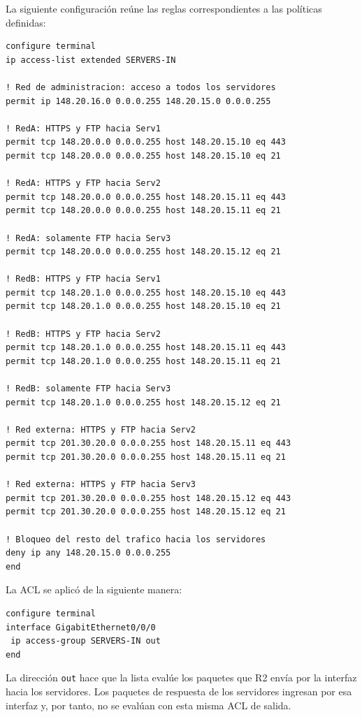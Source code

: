 \documentclass[12pt,a4paper]{article}
\begin{document}
La siguiente configuración reúne las reglas correspondientes
a las políticas definidas:

\begin{lstlisting}
configure terminal
ip access-list extended SERVERS-IN

! Red de administracion: acceso a todos los servidores
permit ip 148.20.16.0 0.0.0.255 148.20.15.0 0.0.0.255

! RedA: HTTPS y FTP hacia Serv1
permit tcp 148.20.0.0 0.0.0.255 host 148.20.15.10 eq 443
permit tcp 148.20.0.0 0.0.0.255 host 148.20.15.10 eq 21

! RedA: HTTPS y FTP hacia Serv2
permit tcp 148.20.0.0 0.0.0.255 host 148.20.15.11 eq 443
permit tcp 148.20.0.0 0.0.0.255 host 148.20.15.11 eq 21

! RedA: solamente FTP hacia Serv3
permit tcp 148.20.0.0 0.0.0.255 host 148.20.15.12 eq 21

! RedB: HTTPS y FTP hacia Serv1
permit tcp 148.20.1.0 0.0.0.255 host 148.20.15.10 eq 443
permit tcp 148.20.1.0 0.0.0.255 host 148.20.15.10 eq 21

! RedB: HTTPS y FTP hacia Serv2
permit tcp 148.20.1.0 0.0.0.255 host 148.20.15.11 eq 443
permit tcp 148.20.1.0 0.0.0.255 host 148.20.15.11 eq 21

! RedB: solamente FTP hacia Serv3
permit tcp 148.20.1.0 0.0.0.255 host 148.20.15.12 eq 21

! Red externa: HTTPS y FTP hacia Serv2
permit tcp 201.30.20.0 0.0.0.255 host 148.20.15.11 eq 443
permit tcp 201.30.20.0 0.0.0.255 host 148.20.15.11 eq 21

! Red externa: HTTPS y FTP hacia Serv3
permit tcp 201.30.20.0 0.0.0.255 host 148.20.15.12 eq 443
permit tcp 201.30.20.0 0.0.0.255 host 148.20.15.12 eq 21

! Bloqueo del resto del trafico hacia los servidores
deny ip any 148.20.15.0 0.0.0.255
end
\end{lstlisting}

La ACL se aplicó de la siguiente manera:

\begin{lstlisting}
configure terminal
interface GigabitEthernet0/0/0
 ip access-group SERVERS-IN out
end
\end{lstlisting}

La dirección \texttt{out} hace que la lista evalúe los paquetes
que R2 envía por la interfaz hacia los servidores. Los paquetes
de respuesta de los servidores ingresan por esa interfaz y,
por tanto, no se evalúan con esta misma ACL de salida.
\end{document}
